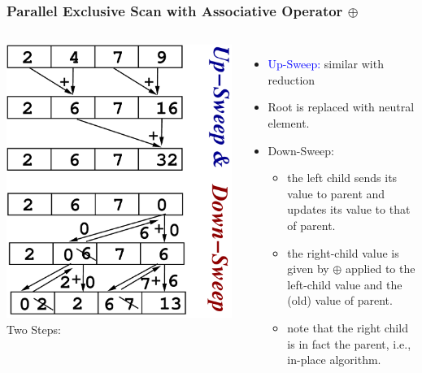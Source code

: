 \documentclass{beamer}
\newcommand{\blue}[1]{\textcolor{Blue}{{#1}}}
\newcommand{\emp}[1]{\textcolor{DikuRed}{ #1}}
\begin{document}
\begin{frame}[fragile,t]
  \frametitle{Parallel Exclusive Scan with Associative Operator $\oplus$}
\bigskip

\begin{columns}
        \includegraphics[height=33ex]{Figures/L2/ScanEg.pdf} 
Two Steps:
\begin{itemize}
    \item \blue{Up-Sweep:} similar with reduction
    \item Root is replaced with neutral element.
    \item \emp{Down-Sweep:} 
    \begin{itemize}
        \item the left child sends its value to parent and 
                updates its value to that of parent.
        \item the right-child value is given by $\oplus$ 
                applied to the left-child value and
                the (old) value of parent.
        \item note that the right child is in fact the parent,
                i.e., in-place algorithm.
    \end  {itemize}
\end  {itemize}
\end{columns}


\end{frame}
\end{document}
